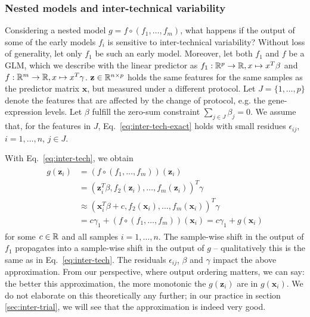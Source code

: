 \subsubsection{Nested models and inter-technical variability}

Considering a nested model $g = f \circ (f_1, \ldots, f_m)$, what happens if the output of some of 
the early models $f_i$ is sensitive to inter-technical variability? Without loss of generality, let 
only $f_1$ be such an early model. Moreover, let both $f_1$ and $f$ be a GLM, which we describe 
with the linear predictor as $f_1: \mathbb{R}^p \to \mathbb{R}, x \mapsto x^T \beta$ and $f: \mathbb{R}^m \to \mathbb{R}, 
x \mapsto x^T \gamma$. 
$\mathbf{z} \in \mathbb{R}^{n \times p}$ holds the same features for the same samples as the 
predictor matrix $\mathbf{x}$, but measured under a different protocol. Let $J = \{1, \ldots, p\}$ 
denote the features that are affected by the change of protocol, e.g. the gene-expression levels.
Let $\beta$ fulfill the zero-sum constraint $\sum_{j \in J} \beta_j = 0$.
We assume that, for the features in $J$, Eq.\ \eqref{eq:inter-tech-exact} holds with small residues 
$\epsilon_{ij}$, $i = 1, \ldots, n$, $j \in J$. 

With Eq.\ \eqref{eq:inter-tech}, we obtain
\begin{align}\label{eq:inter-tech-nested}
\begin{split}
    g(\mathbf{z}_i) &= (f \circ (f_1, \ldots, f_m))(\mathbf{z}_i) \\ 
    &= (\mathbf{z}_i^T \beta, f_2(\mathbf{z}_i), \ldots, f_m(\mathbf{z}_i))^T \gamma \\
    &\approx (\mathbf{x}_i^T \beta + c, f_2(\mathbf{x}_i), \ldots, f_m(\mathbf{x}_i))^T \gamma \\ 
    &= c \gamma_1 + (f \circ (f_1, \ldots, f_m))(\mathbf{x}_i) = c \gamma_1 + g(\mathbf{x}_i)
\end{split}
\end{align}
for some $c \in \mathbb{R}$ and all samples $i = 1, \ldots, n$. The sample-wise shift in the output of 
$f_1$ propagates into a sample-wise shift in the output of $g$ -- qualitatively this is the same 
as in Eq.\ \ref{eq:inter-tech}. The residuals $\epsilon_{ij}$, $\beta$ and $\gamma$ impact the 
above approximation. From our 
perspective, where output ordering matters, we can say: the better this approximation, the more 
monotonic the $g(\mathbf{z}_i)$ are in $g(\mathbf{x}_i)$. We do not elaborate on this theoretically any further; 
in our practice in section \ref{sec:inter-trial}, we will see that the approximation is indeed
very good.

